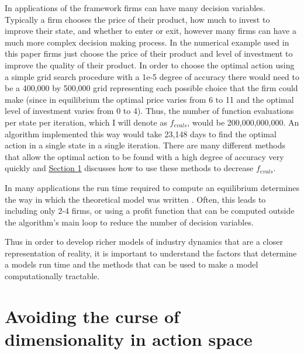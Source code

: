 \documentclass[12pt]{article}
\begin{document}
In applications of the \citet{1995_Erickson_Pakes_RES} framework firms can have many decision variables. Typically a firm chooses the price of their product, how much to invest to improve their state, and whether to enter or exit, however many firms can have a much more complex decision making process. In the numerical example used in this paper firms just choose the price of their product and level of investment to improve the quality of their product. In order to choose the optimal action using a simple grid search procedure with a 1e-5 degree of accuracy there would need to be a 400,000 by 500,000 grid representing each possible choice that the firm could make (since in equilibrium the optimal price varies from 6 to 11 and the optimal level of investment varies from 0 to 4). Thus, the number of function evaluations per state per iteration, which I will denote as $f_{evals}$, would be 200,000,000,000. An algorithm implemented this way would take 23,148 days to find the optimal action in a single state in a single iteration. There are many different methods that allow the optimal action to be found with a high degree of accuracy very quickly and \hyperref[action]{Section \ref{action}} discusses how to use these methods to decrease $f_{evals}$.

In many applications the run time required to compute an equilibrium determines the way in which the theoretical model was written \citep{2007_Doraszelski_Pakes, 2015_Benkard_Weintraub_Jeziorski_RAND}. Often, this leads to including only 2-4 firms, or using a profit function that can be computed outside the algorithm's main loop to reduce the number of decision variables.

Thus in order to develop richer models of industry dynamics that are a closer representation of reality, it is important to understand the factors that determine a models run time and the methods that can be used to make a model computationally tractable.

\section{Avoiding the curse of dimensionality in action space}
\label{action}
\end{document}
